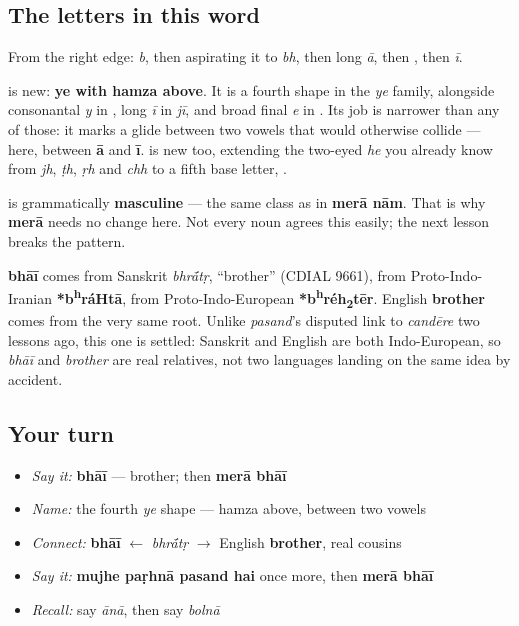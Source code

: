 \subsection*{The letters in this word}
From the right edge: \textbf{} \emph{b}, then \textbf{} aspirating it to \emph{bh}, then \textbf{} long \emph{ā}, then \textbf{}, then \textbf{} \emph{ī}.

\textbf{} is new: \textbf{ye with hamza above}. It is a fourth shape in the \emph{ye} family, alongside consonantal \emph{y} in \textbf{}, long \emph{ī} in \emph{jī}, and broad final \emph{e} in \textbf{}. Its job is narrower than any of those: it marks a glide between two vowels that would otherwise collide — here, between \textbf{ā} and \textbf{ī}. \textbf{} is new too, extending the two-eyed \emph{he} you already know from \emph{jh}, \emph{ṭh}, \emph{ṛh} and \emph{chh} to a fifth base letter, \textbf{}.

\begin{grammarlens}[title={Grammar Lens: a noun with a gender}]
\textbf{} is grammatically \textbf{masculine} — the same class as \textbf{} in \textbf{merā nām}. That is why \textbf{merā} needs no change here. Not every noun agrees this easily; the next lesson breaks the pattern.
\end{grammarlens}

\begin{cousinweb}
\textbf{bhāī} comes from Sanskrit \emph{bhr\'{\={a}}tṛ}, \textquotedblleft{}brother\textquotedblright{} (CDIAL 9661), from Proto-Indo-Iranian \textbf{*b\textsuperscript{h}ráHtā}, from Proto-Indo-European \textbf{*b\textsuperscript{h}réh\textsubscript{2}tēr}. English \textbf{brother} comes from the very same root. Unlike \emph{pasand}'s disputed link to \emph{candēre} two lessons ago, this one is settled: Sanskrit and English are both Indo-European, so \emph{bhāī} and \emph{brother} are real relatives, not two languages landing on the same idea by accident.
\end{cousinweb}

\subsection*{Your turn}
\begin{itemize}
\raggedright
  \item \emph{Say it:} \textbf{bhāī} — brother; then \textbf{merā bhāī}
  \item \emph{Name:} the fourth \emph{ye} shape — hamza above, between two vowels
  \item \emph{Connect:} \textbf{bhāī} $\leftarrow$ \emph{bhr\'{\={a}}tṛ} $\to$ English \textbf{brother}, real cousins
  \item \emph{Say it:} \textbf{mujhe paṛhnā pasand hai} once more, then \textbf{merā bhāī}
  \item \emph{Recall:} say \emph{ānā}, then say \emph{bolnā}
\end{itemize}

